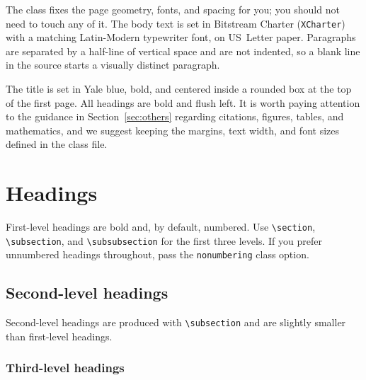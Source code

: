 \documentclass[11pt,letterpaper,logo]{yalearxiv}
\begin{document}
The class fixes the page geometry, fonts, and spacing for you; you should not
need to touch any of it. The body text is set in Bitstream Charter
(\verb+XCharter+) with a matching Latin-Modern typewriter font, on US~Letter
paper. Paragraphs are separated by a half-line of vertical space and are not
indented, so a blank line in the source starts a visually distinct paragraph.

The title is set in Yale blue, bold, and centered inside a rounded box at the top
of the first page. All headings are bold and flush left. It is worth paying
attention to the guidance in Section~\ref{sec:others} regarding citations,
figures, tables, and mathematics, and we suggest keeping the margins, text width,
and font sizes defined in the class file.


\section{Headings}
\label{sec:headings}

First-level headings are bold and, by default, numbered. Use \verb+\section+,
\verb+\subsection+, and \verb+\subsubsection+ for the first three levels. If you
prefer unnumbered headings throughout, pass the \verb+nonumbering+ class option.

\subsection{Second-level headings}
\label{sec:second}

Second-level headings are produced with \verb+\subsection+ and are slightly
smaller than first-level headings.

\subsubsection{Third-level headings}
\label{sec:third}
\end{document}
